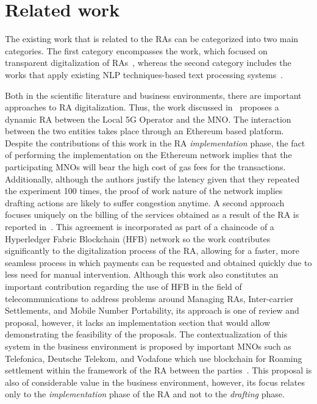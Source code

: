 \section{Related work}\label{related}

The existing work that is related to the RAs can be categorized into two main categories. The first category encompasses the work, which focused on transparent digitalization of RAs~\cite{9369516, 9024541, Huillet2020}, whereas the second category includes the works that apply existing NLP techniques-based text processing systems~\cite{8487847, 9138070, 9104105}.

Both in the scientific literature and business environments, there are important approaches to RA digitalization. Thus, the work discussed in~\cite{9369516} proposes a dynamic RA between the Local 5G Operator and the MNO. The interaction between the two entities takes place through an Ethereum based platform. Despite the contributions of this work in the RA \textit{implementation} phase, the fact of performing the implementation on the Ethereum network implies that the participating MNOs will bear the high cost of gas fees for the transactions. Additionally, although the authors justify the latency given that they repeated the experiment 100 times, the proof of work nature of the network implies drafting actions are likely to suffer congestion anytime. A second approach focuses uniquely on the billing of the services obtained as a result of the RA is reported in~\cite{9024541}. This agreement is incorporated as part of a chaincode of a Hyperledger Fabric Blockchain (HFB) network so the work contributes significantly to the digitalization process of the RA, allowing for a faster, more seamless process in which payments can be requested and obtained quickly due to less need for manual intervention. Although this work also constitutes an important contribution regarding the use of HFB in the field of telecommunications to address problems around Managing RAs, Inter-carrier Settlements, and Mobile Number Portability, its approach is one of review and proposal, however, it lacks an implementation section that would allow demonstrating the feasibility of the proposals. The contextualization of this system in the business environment is proposed by important MNOs such as Telefonica, Deutsche Telekom, and Vodafone which use blockchain for Roaming settlement within the framework of the RA between the parties~\cite{Huillet2020}. This proposal is also of considerable value in the business environment, however, its focus relates only to the \textit{implementation} phase of the RA and not to the \textit{drafting} phase. 

